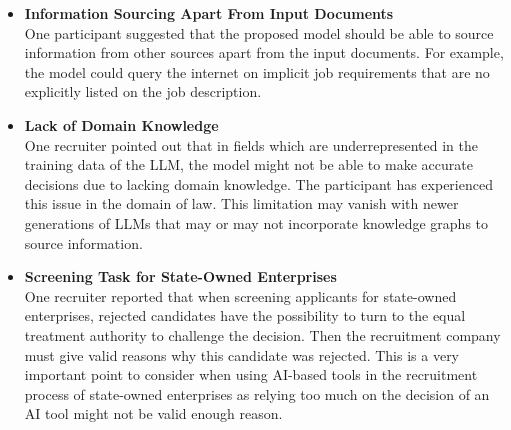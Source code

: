 \documentclass[draft,final]{thesisclass} %
\begin{document}
\begin{enumerate}
\begin{itemize}
        \item \textbf{Information Sourcing Apart From Input Documents}\\
        One participant suggested that the proposed model should be able to source information from other sources apart from the input documents.
        For example, the model could query the internet on implicit job requirements that are no explicitly listed on the job description.
        \item \textbf{Lack of Domain Knowledge}\\
        One recruiter pointed out that in fields which are underrepresented in the training data of the \acs{LLM}, the model might not be able to make accurate decisions due to lacking domain knowledge. The participant has experienced this issue in the domain of law. This limitation may vanish with newer generations of \acs{LLM}s that may or may not incorporate knowledge graphs to source information.
        \item \textbf{Screening Task for State-Owned Enterprises}\\
        One recruiter reported that when screening applicants for state-owned enterprises, rejected candidates have the possibility to turn to the equal treatment authority to challenge the decision. Then the recruitment company must give valid reasons why this candidate was rejected. This is a very important point to consider when using \acs{AI}-based tools in the recruitment process of state-owned enterprises as relying too much on the decision of an \acs{AI} tool might not be valid enough reason.
    \end{itemize}
\end{enumerate}
\end{document}

